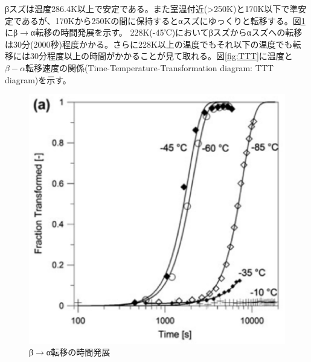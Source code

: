 βスズは温度286.4K以上で安定である。また室温付近(>250K)と170K以下で準安定であるが、170Kから250Kの間に保持するとαスズにゆっくりと転移する。図\ref{fig:beta-to-alpha}にβ$\to$α転移の時間発展を示す\cite{Nogita}。
228K(-45℃)においてβスズからαスズへの転移は30分(2000秒)程度かかる。さらに228K以上の温度でもそれ以下の温度でも転移には30分程度以上の時間がかかることが見て取れる。図\ref{fig:TTT}に温度と$\beta-\alpha$転移速度の関係(Time-Temperature-Transformation diagram: TTT diagram)を示す。
\begin{figure}[!h]
 \begin{minipage}{0.5\hsize}
    \begin{center}
   \includegraphics[width=\hsize]{Introduction/beta-to-alpha.eps}
  \end{center}
  \caption{β$\to$α転移の時間発展}
  \label{fig:beta-to-alpha}
 \end{minipage}
  \begin{minipage}{0.5\hsize}
     \begin{center}

\end{center}
\end{minipage}
\end{figure}
